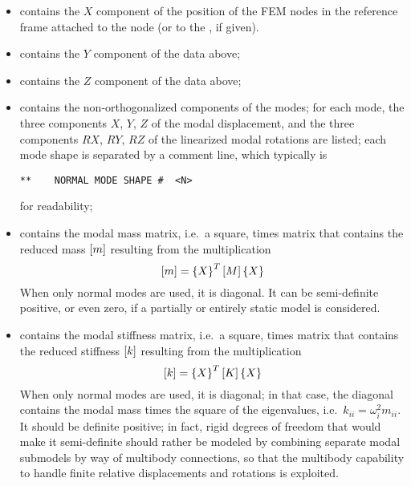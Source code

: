 \begin{itemize}
\item {} contains the $X$ component of the position
of the  FEM nodes in the reference frame attached 
to the  node (or to the , if given).

\item {} contains the $Y$ component of the data above;

\item {} contains the $Z$ component of the data above;

\item {} contains the non-orthogonalized components 
of the  modes; for each mode, the three components 
$X$, $Y$, $Z$ of the modal displacement, and the three components
$RX$, $RY$, $RZ$ of the linearized modal rotations are listed;
each mode shape is separated by a comment line, which typically is
\begin{verbatim}
**    NORMAL MODE SHAPE #  <N>
\end{verbatim}
for readability;

\item {} contains the modal mass matrix,
i.e.\ a square,  times  matrix that contains
the reduced mass $\left[ m \right]$ resulting from the multiplication
\begin{equation}
	\label{eq:modal-mass-constraint}
	\left[ m \right] = \left\{ X \right\}^T \left[ M \right] \left\{ X \right\}
\end{equation}
When only normal modes are used, it is diagonal.
It can be semi-definite positive, or even zero, if a partially 
or entirely static model is considered.

\item {} contains the modal stiffness matrix,
i.e.\ a square,  times  matrix that contains
the reduced stiffness $\left[ k \right]$ resulting from the multiplication
\begin{equation}
	\left[ k \right] = \left\{ X \right\}^T \left[ K \right] \left\{ X \right\}
\end{equation}
When only normal modes are used, it is diagonal; in that case,
the diagonal contains the modal mass times the square 
of the eigenvalues, i.e.\ $k_{ii} = \omega_i^2 m_{ii}$.
It should be definite positive; in fact, rigid degrees of freedom
that would make it semi-definite should rather be modeled by combining
separate modal submodels by way of multibody connections, so that
the multibody capability to handle finite relative displacements
and rotations is exploited.


\end{itemize}
